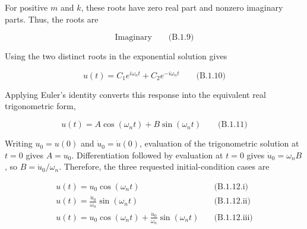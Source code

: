 For positive \(m\) and \(k\), these roots have zero real part and nonzero imaginary parts. Thus, the roots are

\[\boxed{\text{Imaginary}}\qquad\text{(B.1.9)}\]

Using the two distinct roots in the exponential solution gives

\[\boxed{u(t)=C_1e^{i\omega_nt}+C_2e^{-i\omega_nt}}\qquad\text{(B.1.10)}\]

Applying Euler's identity converts this response into the equivalent real trigonometric form,

\[\boxed{u(t)=A\cos(\omega_nt)+B\sin(\omega_nt)}\qquad\text{(B.1.11)}\]

Writing \(u_0=u(0)\) and \(\dot u_0=\dot u(0)\), evaluation of the trigonometric solution at \(t=0\) gives \(A=u_0\). Differentiation followed by evaluation at \(t=0\) gives \(\dot u_0=\omega_n B\), so \(B=\dot u_0/\omega_n\). Therefore, the three requested initial-condition cases are

\[
\begin{aligned}
\boxed{u(t)=u_0\cos(\omega_nt)}&\quad\text{(B.1.12.i)}\\[3pt]
\boxed{u(t)=\frac{\dot u_0}{\omega_n}\sin(\omega_nt)}&\quad\text{(B.1.12.ii)}\\[3pt]
\boxed{u(t)=u_0\cos(\omega_nt)+\frac{\dot u_0}{\omega_n}\sin(\omega_nt)}&\quad\text{(B.1.12.iii)}
\end{aligned}
\]

\endgroup
